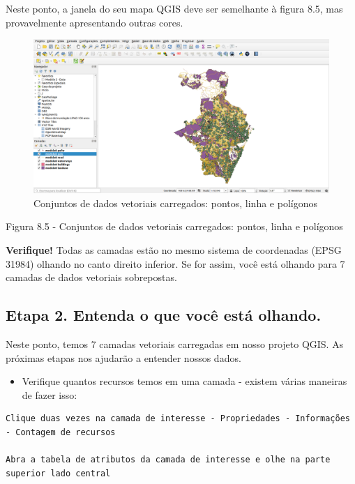 \documentclass[
  portuguese,
]{krantz}
\providecommand{\tightlist}{%
  \setlength{\itemsep}{0pt}\setlength{\parskip}{0pt}}
\begin{document}
Neste ponto, a janela do seu mapa QGIS deve ser semelhante à figura 8.5, mas provavelmente apresentando outras cores.

\begin{figure}
\centering
\includegraphics{media/modulo8/fig85.png}
\caption{Conjuntos de dados vetoriais carregados: pontos, linha e polígonos}
\end{figure}

Figura 8.5 - Conjuntos de dados vetoriais carregados: pontos, linha e polígonos

\textbf{Verifique!} Todas as camadas estão no mesmo sistema de coordenadas (EPSG 31984) olhando no canto direito inferior. Se for assim, você está olhando para 7 camadas de dados vetoriais sobrepostas.

\hypertarget{etapa-2.-entenda-o-que-vocuxea-estuxe1-olhando.}{%
\subsection{\texorpdfstring{\textbf{Etapa 2. Entenda o que você está olhando.}}{Etapa 2. Entenda o que você está olhando.}}\label{etapa-2.-entenda-o-que-vocuxea-estuxe1-olhando.}}

Neste ponto, temos 7 camadas vetoriais carregadas em nosso projeto QGIS. As próximas etapas nos ajudarão a entender nossos dados.

\begin{itemize}
\tightlist
\item
  Verifique quantos recursos temos em uma camada - existem várias maneiras de fazer isso:
\end{itemize}

\begin{verbatim}
Clique duas vezes na camada de interesse - Propriedades - Informações - Contagem de recursos

Abra a tabela de atributos da camada de interesse e olhe na parte superior lado central
\end{verbatim}
\end{document}
